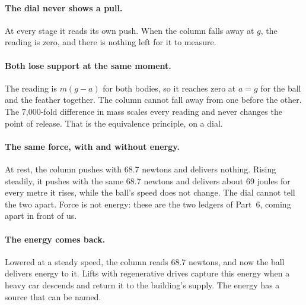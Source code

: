 \paragraph{The dial never shows a pull.} At every stage it reads its own push. When the column falls away at $g$, the reading is zero, and there is nothing left for it to measure.

\paragraph{Both lose support at the same moment.} The reading is $m(g-a)$ for both bodies, so it reaches zero at $a=g$ for the ball and the feather together. The column cannot fall away from one before the other. The 7{,}000-fold difference in mass scales every reading and never changes the point of release. That is the equivalence principle, on a dial.

\paragraph{The same force, with and without energy.} At rest, the column pushes with 68.7 newtons and delivers nothing. Rising steadily, it pushes with the same 68.7 newtons and delivers about 69 joules for every metre it rises, while the ball's speed does not change. The dial cannot tell the two apart. Force is not energy: these are the two ledgers of Part~6, coming apart in front of us. 

\paragraph{The energy comes back.} Lowered at a steady speed, the column reads 68.7 newtons, and now the ball delivers energy to it. Lifts with regenerative drives capture this energy when a heavy car descends and return it to the building's supply.  The energy has a source that can be named.

